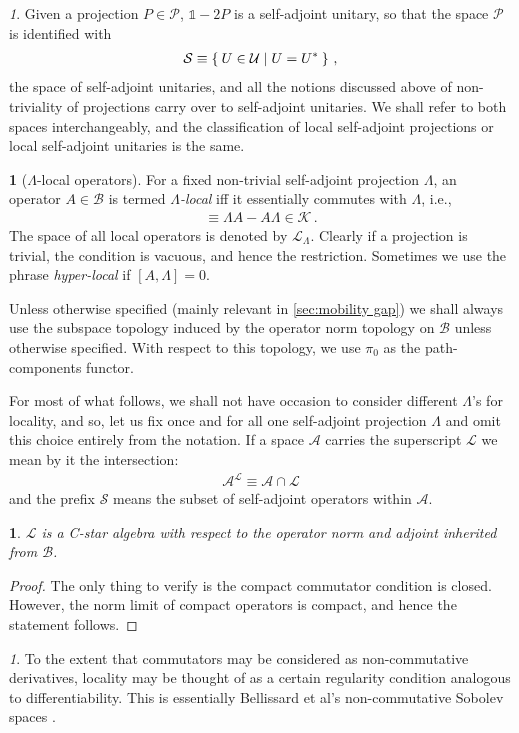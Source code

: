 \documentclass[a4paper,10pt]{article}
\numberwithin{equation}{section}
\theoremstyle{plain}
\theoremstyle{plain}
\newtheorem{lem}[thm]{\protect\lemmaname}
\theoremstyle{plain}
\theoremstyle{plain}
\theoremstyle{plain}
\theoremstyle{remark}
\newtheorem{rem}[thm]{\protect\remarkname}
\theoremstyle{definition}
\newtheorem{defn}[thm]{\protect\definitionname}
\theoremstyle{plain}
\providecommand{\definitionname}{Definition}
\providecommand{\lemmaname}{Lemma}
\providecommand{\remarkname}{Remark}
\newcommand{\calA}{\mathcal{A}}
\newcommand{\calB}{\mathcal{B}}
\newcommand{\calU}{\mathcal{U}}
\newcommand{\calSU}{\mathcal{S}}
\newcommand{\calK}{\mathcal{K}}
\newcommand{\calL}{\mathcal{L}}
\newcommand{\calP}{\mathcal{P}}
\newcommand{\calS}{\mathcal{S}}
\newcommand{\Id}{\mathds{1}}
\newcommand{\eq}[1]{\begin{align*}#1\end{align*}}
\newcommand{\eql}[1]{\begin{align}#1\end{align}}
\begin{document}
	\begin{rem}\label{rem:connection between projections and self-adjoint unitaries}Given a projection $P\in\calP$, $\Id-2P$ is a self-adjoint unitary, so that the space $\calP$ is identified with \eq{\calSU\equiv\Set{U\in\calU|U=U^\ast}\,,} the space of self-adjoint unitaries, and all the notions discussed above of non-triviality of projections carry over to self-adjoint unitaries. We shall refer to both spaces interchangeably, and the classification of local self-adjoint projections or local self-adjoint unitaries is the same.
	\end{rem}
	
	
	\begin{defn}[$\Lambda$-local operators]\label{def:Lambda-local operators} For a fixed non-trivial self-adjoint projection $\Lambda$, an operator $A\in\calB$ is termed \emph{$\Lambda$-local} iff it essentially commutes with $\Lambda$, i.e., \eql{[\Lambda,A]\equiv\Lambda A-A\Lambda\in\calK\,.} The space of all local operators is denoted by $\calL_\Lambda$. Clearly if a projection is trivial, the condition is vacuous, and hence the restriction. Sometimes we use the phrase \emph{hyper-local} if $[A,\Lambda]=0$.
	\end{defn} 
	
	Unless otherwise specified (mainly relevant in \cref{sec:mobility gap}) we shall always use the subspace topology induced by the operator norm topology on $\calB$ unless otherwise specified. With respect to this topology, we use $\pi_0$ as the path-components functor. 
	
	For most of what follows, we shall not have occasion to consider different $\Lambda$'s for locality, and so, let us fix once and for all one self-adjoint projection $\Lambda$ and omit this choice entirely from the notation. If a space $\calA$ carries the superscript $\calL$ we mean by it the intersection: \eql{\calA^\calL \equiv \calA\cap\calL} and the prefix $\calS$ means the subset of self-adjoint operators within $\calA$.
	
	\begin{lem}
		$\calL$ is a C-star algebra with respect to the operator norm and adjoint inherited from $\calB$.
	\end{lem}
	\begin{proof}
		The only thing to verify is the compact commutator condition is closed. However, the norm limit of compact operators is compact, and hence the statement follows.
	\end{proof}
	\begin{rem}
		To the extent that commutators may be considered as non-commutative derivatives, locality may be thought of as a certain regularity condition analogous to differentiability. This is essentially Bellissard et al's non-commutative Sobolev spaces \cite{Bellissard_1994JMP....35.5373B}.
	\end{rem}
	
\end{document}
